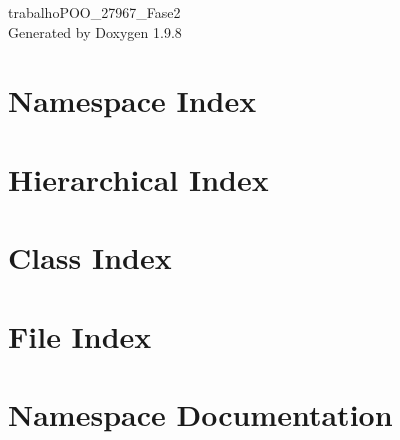 \documentclass[twoside]{book}
\newcommand{\+}{\discretionary{\mbox{\scriptsize$\hookleftarrow$}}{}{}}
\newcommand{\clearemptydoublepage}{%
    \newpage{\pagestyle{empty}\cleardoublepage}%
  }
\begin{document}
  \raggedbottom
    \hypersetup{pageanchor=false,
                bookmarksnumbered=true,
                pdfencoding=unicode
               }
  \begin{titlepage}
  \vspace*{7cm}
  \begin{center}%
  {\Large trabalho\+POO\+\_\+27967\+\_\+\+Fase2}\\
  \vspace*{1cm}
  {\large Generated by Doxygen 1.9.8}\\
  \end{center}
  \end{titlepage}
  \clearemptydoublepage
  \tableofcontents
  \clearemptydoublepage
  \hypersetup{pageanchor=true}
\chapter{Namespace Index}

\chapter{Hierarchical Index}

\chapter{Class Index}

\chapter{File Index}

\chapter{Namespace Documentation}











\end{document}
